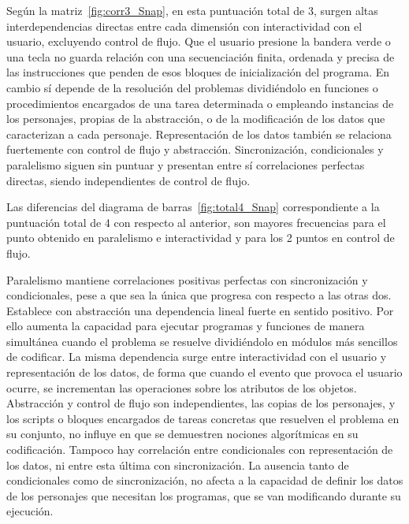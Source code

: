 \documentclass[a4paper, 12pt]{book}
\begin{document}
Según la matriz~\ref{fig:corr3_Snap}, en esta puntuación total de 3, surgen altas interdependencias directas entre cada dimensión con interactividad con el usuario, excluyendo control de flujo. Que el usuario presione la bandera verde o una tecla no guarda relación con una secuenciación finita, ordenada y precisa de las instrucciones que penden de esos bloques de inicialización del programa. En cambio sí depende de la resolución del problemas dividiéndolo en funciones o procedimientos encargados de una tarea determinada o empleando instancias de los personajes, propias de la abstracción, o de la modificación de los datos que caracterizan a cada personaje. Representación de los datos también se relaciona fuertemente con control de flujo y abstracción. Sincronización, condicionales y paralelismo siguen sin puntuar y presentan entre sí correlaciones perfectas directas, siendo independientes de control de flujo.

Las diferencias del diagrama de barras~\ref{fig:total4_Snap} correspondiente a la puntuación total de 4 con respecto al anterior, son mayores frecuencias para el punto obtenido en paralelismo e interactividad y para los 2 puntos en control de flujo.

Paralelismo mantiene correlaciones positivas perfectas con sincronización y condicionales, pese a que sea la única que progresa con respecto a las otras dos. Establece con abstracción una dependencia lineal fuerte en sentido positivo. Por ello aumenta la capacidad para ejecutar programas y funciones de manera simultánea cuando el problema se resuelve dividiéndolo en módulos más sencillos de codificar. 
La misma dependencia surge entre interactividad con el usuario y representación de los datos, de forma que cuando el evento que provoca el usuario ocurre, se incrementan las operaciones sobre los atributos de los objetos. 
Abstracción y control de flujo son independientes, las copias de los personajes, y los scripts o bloques encargados de tareas concretas que resuelven el problema en su conjunto, no influye en que se demuestren nociones algorítmicas en su codificación.
Tampoco hay correlación entre condicionales con representación de los datos, ni entre esta última con sincronización. La ausencia tanto de condicionales como de sincronización, no afecta a la capacidad de definir los datos de los personajes que necesitan los programas, que se van modificando durante su ejecución.
\end{document}
